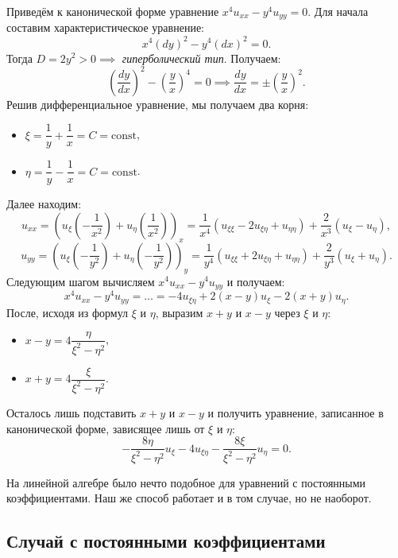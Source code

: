 \begin{example}
    Приведём к канонической форме уравнение $x^4 u_{xx} - y^4 u_{yy} = 0$. Для начала составим характеристическое уравнение:
    $$ x^4 (dy)^2 - y^4 (dx)^2 = 0. $$
    Тогда $D = 2 y^2 > 0 \implies$ \textit{гиперболический тип}. Получаем:
    $$ \left( \dfrac{dy}{dx} \right)^2 - \left( \dfrac{y}{x} \right)^4 = 0 \implies \dfrac{dy}{dx} = \pm \left( \dfrac{y}{x} \right)^2. $$
    Решив дифференциальное уравнение, мы получаем два корня:
    \begin{itemize}
        \item $\xi = \dfrac{1}{y} + \dfrac{1}{x} = C = \text{const}$,
        \item $\eta = \dfrac{1}{y} - \dfrac{1}{x} = C = \text{const}$.
    \end{itemize}
    Далее находим:
    $$ u_{xx} = \left( u_\xi \left( -\dfrac{1}{x^2} \right) + u_\eta \left( \dfrac{1}{x^2} \right) \right)_x = \dfrac{1}{x^4} (u_{\xi \xi} - 2 u_{\xi \eta} + u_{\eta \eta}) + \dfrac{2}{x^3} (u_\xi - u_\eta), $$
    $$ u_{yy} = \left( u_\xi \left( -\dfrac{1}{y^2} \right) + u_\eta \left( -\dfrac{1}{y^2} \right) \right)_y = \dfrac{1}{y^4} (u_{\xi \xi} + 2 u_{\xi \eta} + u_{\eta \eta}) + \dfrac{2}{y^3} (u_\xi + u_\eta). $$
    Следующим шагом вычисляем $x^4 u_{xx} - y^4 u_{yy}$ и получаем:
    $$ x^4 u_{xx} - y^4 u_{yy} = \dots = -4 u_{\xi \eta} + 2 (x - y) u_\xi - 2 (x + y) u_\eta. $$
    После, исходя из формул $\xi$ и $\eta$, выразим $x + y$ и $x - y$ через $\xi$ и $\eta$:
    \begin{itemize}
        \item $x - y = 4 \dfrac{\eta}{\xi^2 - \eta^2}$,
        \item $x + y = 4 \dfrac{\xi}{\xi^2 - \eta^2}$.
    \end{itemize}
    Осталось лишь подставить $x + y$ и $x - y$ и получить уравнение, записанное в канонической форме, зависящее лишь от $\xi$ и $\eta$:
    $$ -\dfrac{8 \eta}{\xi^2 - \eta^2} u_\xi - 4 u_{\xi \eta} - \dfrac{8 \xi}{\xi^2 - \eta^2} u_\eta = 0. $$
\end{example}

\begin{remark}
    На линейной алгебре было нечто подобное для уравнений с постоянными коэффициентами. Наш же способ работает и в том случае, но не наоборот.
\end{remark}

\subsection*{Случай с постоянными коэффициентами}

